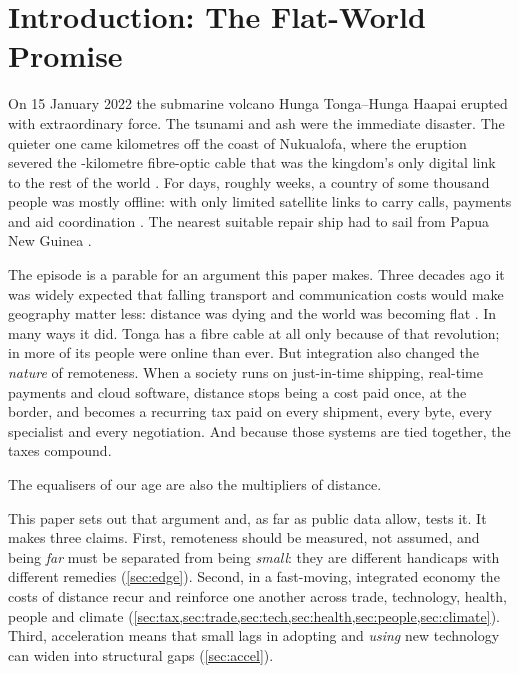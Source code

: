 \section{Introduction: The Flat-World Promise}
\label{sec:intro}

On 15 January 2022 the submarine volcano Hunga Tonga--Hunga Ha\okina apai
erupted with extraordinary force. The tsunami and ash were
the immediate disaster. The quieter one came \tongaCableCutOffshoreKm{}
kilometres off the coast of Nuku\okina alofa, where the eruption severed the
\tongaCableKm-kilometre fibre-optic cable that was the kingdom's only
digital link to the rest of the world \parencite{subtel2022tonga,euronews2022tonga}.
For \tongaOutageDays{} days, roughly \tongaOutageWeeks{} weeks, a country of
some \popTongaK{} thousand people was mostly offline: with only limited satellite links to carry calls, payments and
aid coordination \parencite{sbs2022tonga}. The nearest suitable repair ship
had to sail from Papua New Guinea \parencite{pina2022ship}.

The episode is a parable for an argument this paper makes. Three decades ago
it was widely expected that falling transport and communication costs would
make geography matter less: distance was dying \parencite{cairncross1997} and
the world was becoming flat \parencite{friedman2005}. In many ways it did.
Tonga has a fibre cable at all only because of that revolution; in
\windowEnd{} more of its people were online than ever. But integration also
changed the \emph{nature} of remoteness. When a society runs on just-in-time
shipping, real-time payments and cloud software, distance stops being a cost
paid once, at the border, and becomes a recurring tax paid on every shipment,
every byte, every specialist and every negotiation. And because those systems
are tied together, the taxes compound.

\begin{pullquote}
The equalisers of our age are also the multipliers of distance.
\end{pullquote}

This paper sets out that argument and, as far as public data allow, tests it.
It makes three claims. First, remoteness should be measured, not assumed, and
being \emph{far} must be separated from being \emph{small}: they are different
handicaps with different remedies (\cref{sec:edge}). Second, in a fast-moving,
integrated economy the costs of distance recur and reinforce one another
across trade, technology, health, people and climate
(\cref{sec:tax,sec:trade,sec:tech,sec:health,sec:people,sec:climate}).
Third, acceleration means that small lags in adopting and \emph{using} new
technology can widen into structural gaps (\cref{sec:accel}).

